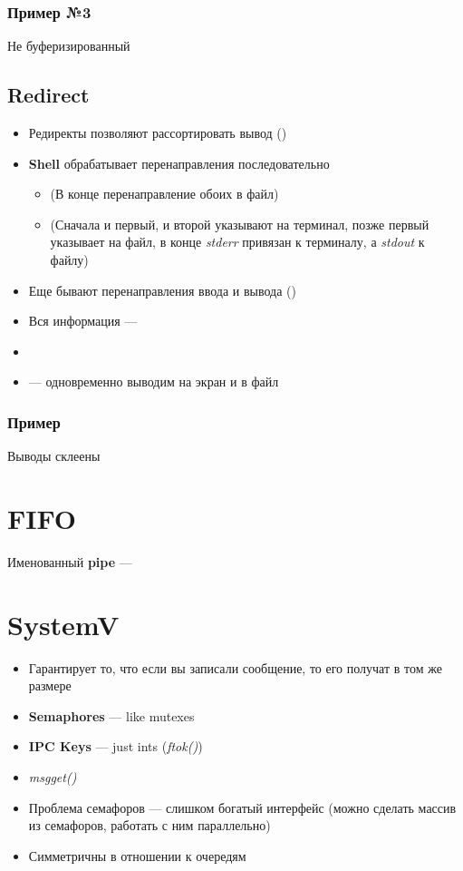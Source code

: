 \documentclass[../../lectures.tex]{subfiles}
\begin{document}
\subsubsection{Пример №3}
Не буферизированный

\subsection{Redirect}
\begin{itemize}
    \item Редиректы позволяют рассортировать вывод ()
    \item \textbf{Shell} обрабатывает перенаправления последовательно
        \begin{itemize}
                \item {} (В конце перенаправление обоих в файл)
                \item {} (Сначала и первый, и второй указывают на терминал, позже первый указывает на файл, в конце \emph{stderr} привязан к терминалу, а \emph{stdout} к файлу)
        \end{itemize}
    \item Еще бывают перенаправления ввода и вывода ()
    \item Вся информация --- 
    \item {}
    \item {} --- одновременно выводим на экран и в файл
\end{itemize}

\subsubsection{Пример}
Выводы склеены

\section{FIFO}
Именованный \textbf{pipe} --- 

\newpage
\section{SystemV}
\begin{itemize}
    \item Гарантирует то, что если вы записали сообщение, то его получат в том же размере
    \item \textbf{Semaphores} --- like mutexes
    \item \textbf{IPC Keys} --- just ints (\emph{ftok()})
    \item \emph{msgget()}
    \item Проблема семафоров --- слишком богатый интерфейс (можно сделать массив из семафоров, работать с ним параллельно)
    \item Симметричны в отношении к очередям 
\end{itemize}
\end{document}
